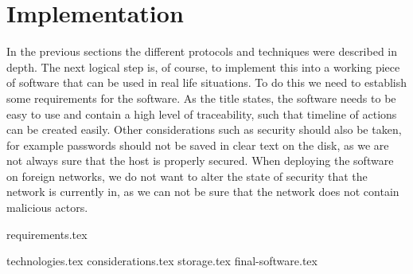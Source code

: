 \documentclass{article}
\begin{document}
\section{Implementation}
In the previous sections the different protocols and techniques were described in depth. The next logical step is, of course, to implement this into a working piece of software that can be used in real life situations. To do this we need to establish some requirements for the software. As the title states, the software needs to be easy to use and contain a high level of traceability, such that timeline of actions can be created easily. Other considerations such as security should also be taken, for example passwords should not be saved in clear text on the disk, as we are not always sure that the host is properly secured. When deploying the software on foreign networks, we do not want to alter the state of security that the network is currently in, as we can not be sure that the network does not contain malicious actors.

{requirements.tex}

{technologies.tex}
{considerations.tex}
{storage.tex}
{final-software.tex}
\end{document}
